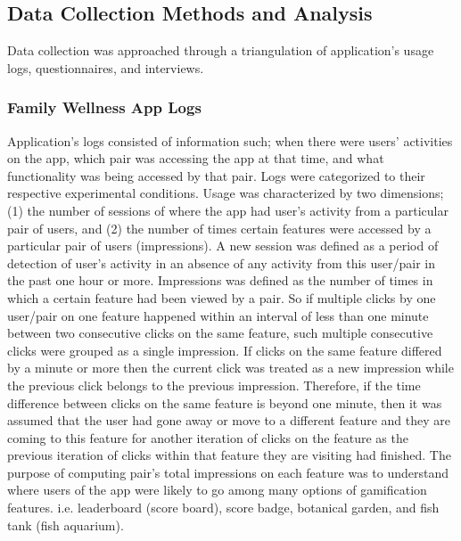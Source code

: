 \subsection{Data Collection Methods and Analysis}
Data collection was approached through a triangulation of application's usage logs, questionnaires, and interviews. 
\subsubsection{Family Wellness App Logs}
Application's logs consisted of information such; when there were users' activities on the app, which pair was accessing the app at that time, and what functionality was being accessed by that pair. Logs were categorized to their respective experimental conditions. Usage was characterized by two dimensions; (1) the number of sessions of where the app had user's activity from a particular pair of users, and (2) the number of times certain features were accessed by a particular pair of users (impressions). A new session was defined as a period of detection of user's activity in an absence of any activity from this user/pair in the past one hour or more. Impressions was defined as the number of times in which a certain feature had been viewed by a pair. So if multiple clicks by one user/pair on one feature happened within an interval of less than one minute between two consecutive clicks on the same feature, such multiple consecutive clicks were grouped as a single impression. If clicks on the same feature differed by a minute or more then the current click was treated as a new impression while the previous click belongs to the previous impression. Therefore, if the time difference between clicks on the same feature is beyond one minute, then it was assumed that the user had gone away or move to a different feature and they are coming to this feature for another iteration of clicks on the feature as the previous iteration of clicks within that feature they are visiting had finished. The purpose of computing pair's total impressions on each feature was to understand where users of the app were likely to go among many options of gamification features. i.e. leaderboard (score board), score badge, botanical garden, and fish tank (fish aquarium). 
 
